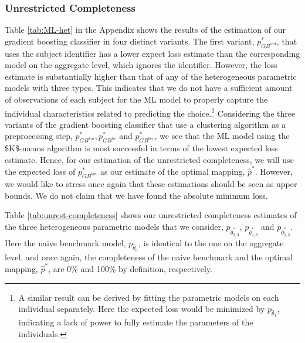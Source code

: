 \documentclass[11pt,a4paper]{article}
\theoremstyle{definition}
\begin{document}
\subsubsection{Unrestricted Completeness}
\label{subsubsec:unrestricted_completeness_res}
Table \ref{tab:ML-het} in the Appendix shows the results of the estimation of our gradient boosting classifier in four distinct variants. The first variant, \(p^*_{GB^{ind}}\), that uses the subject identifier has a lower expect loss estimate than the corresponding model on the aggregate level, which ignores the identifier. However, the loss estimate is substantially higher than that of any of the heterogeneous parametric models with three types. This indicates that we do not have a sufficient amount of observations of each subject for the ML model to properly capture the individual characteristics related to predicting the choice.\footnote{A similar result can be derived by fitting the parametric models on each individual separately. Here the expected loss would be minimized by \(p_{\hat{\theta}_1}\), indicating a lack of power to fully estimate the parameters of the individuals.} Considering the three variants of the gradient boosting classifier that use a clustering algorithm as a preprocessing step,  \(p^*_{GB^{km}},p^*_{GB^{hc}}\) and \(p^*_{GB^{ber}}\), we see that the ML model using the \$K\$-means algorithm is most successful in terms of the lowest expected loss estimate. Hence, for our estimation of the unrestricted completeness, we will use the expected loss of \(p^*_{GB^{km}}\) as our estimate of the optimal mapping, \(\hat{p}^*\). However, we would like to stress once again that these estimations should be seen as upper bounds. We do not claim that we have found the absolute minimum loss.

Table \ref{tab:unrest-completeness} shows our unrestricted completeness estimates of the three heterogeneous parametric models that we consider, \(p_{\hat{\theta}_{2,3}^*}\), \(p_{\hat{\theta}_{4,3}^*}\) and \(p_{\hat{\theta}_{5,3}^*}\). Here the naive benchmark model, \(p_{\hat{\theta}_0}\), is identical to the one on the aggregate level, and once again, the completeness of the naive benchmark and the optimal mapping, \(\hat{p}^*\), are 0\% and 100\% by definition, respectively.
\end{document}
